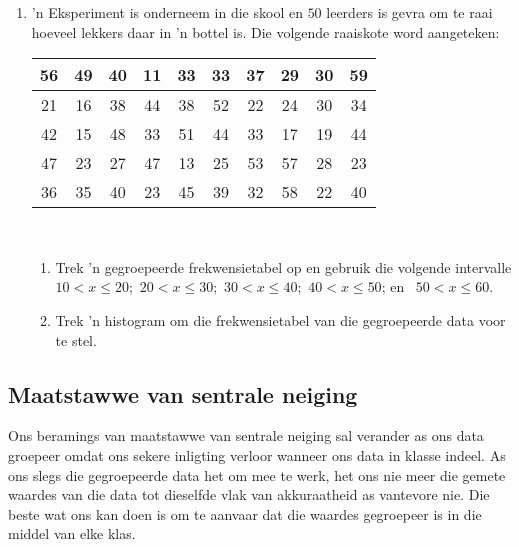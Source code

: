 \begin{exercises}{}{
    \begin{enumerate}[itemsep=5pt, label=\textbf{\arabic*}. ]
    \item ’n Eksperiment is onderneem in die skool en $50$ leerders is gevra om te raai hoeveel lekkers daar in ’n bottel is. Die volgende raaiskote word aangeteken:
      \\
      \begin{center}
        \begin{tabular}{|c|c|c|c|c|c|c|c|c|c|} \hline
          56 & 49 & 40 & 11 & 33 & 33 & 37 & 29 & 30 & 59 \\ \hline
          21 & 16 & 38 & 44 & 38 & 52 & 22 & 24 & 30 & 34 \\\hline
          42 & 15 & 48 & 33 & 51 & 44 & 33 & 17 & 19 & 44 \\\hline
          47 & 23 & 27 & 47 & 13 & 25 & 53 & 57 & 28 & 23 \\\hline
          36 & 35 & 40 & 23 & 45 & 39 & 32 & 58 & 22 & 40 \\\hline
        \end{tabular}
      \end{center}
      \vspace{8pt}\\

      \begin{enumerate}[noitemsep, label=\textbf{(\alph*)} ]
      \item Trek ’n gegroepeerde frekwensietabel op en gebruik die volgende intervalle
        $10 < x \leq 20$;\ $20 < x \leq 30$;\ $30 < x \leq 40$;\ 
        $40 < x \leq 50$; en \ $50 < x \leq 60$.
      \item Trek ’n histogram om die frekwensietabel van die gegroepeerde data voor te stel.
      \end{enumerate}
    \end{enumerate}
}
\end{exercises}
% 
\subsection*{Maatstawwe van sentrale neiging}
Ons beramings van maatstawwe van sentrale neiging sal verander as ons data groepeer omdat ons sekere inligting verloor wanneer ons data in klasse indeel. As ons slegs die gegroepeerde data het om mee te werk, het ons nie meer die gemete waardes van die data tot dieselfde vlak van akkuraatheid as vantevore nie. Die beste wat ons kan doen is om te aanvaar dat die waardes gegroepeer is in die middel van elke klas.\par

